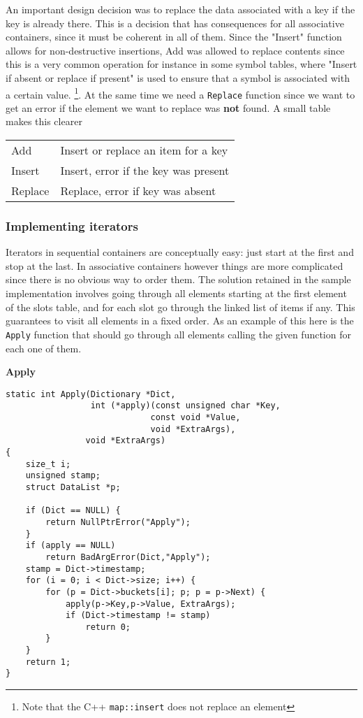 \documentclass[12pt,a4paper]{memoir} %
\newcommand{\function}[1] {%
\vspace{0.2in}
\par\noindent
\textbf{#1}\index{#1!code for \container} \hrulefill
\nopagebreak
\noindent\begin{verbatim}}
\begin{document}
{{An important design decision was to replace the data associated with a key if the key is already there. This is a decision that has consequences for 
all associative containers, since it must be coherent in all of them. Since the "Insert" function allows for non-destructive insertions, Add was
allowed to replace contents since this is a very common operation for instance in some symbol tables, where "Insert if absent or replace if present"
is used to ensure that a symbol is associated with a certain value. \footnote{Note that the C++ \texttt{map::insert} does not replace an element}. At the same time we need a \texttt{Replace} function since we want to get an error if the element we want to replace was \textbf{not} found.
A small table makes this clearer
\par %\vspace{0.5cm}
\begin{center}
\begin{tabular}{|l | l|}
\hline 
Add & Insert or replace an item for a key \\
Insert & Insert, error if the key was present \\
Replace & Replace, error if key was absent \\
\hline
\end{tabular}
\end{center}

\subsubsection{Implementing iterators}
Iterators in sequential containers are conceptually easy: just start at the first and stop at the last. In associative containers however things are 
more complicated since there is no obvious way to order them. The solution retained in the sample implementation involves going through all elements
starting at the first element of the slots table, and for each slot go through the linked list of items if any. This guarantees to visit all elements 
in a fixed order. As an example of this here is the \texttt{Apply} function that should go through all elements calling the given function for each 
one of them.
\function{Apply}
static int Apply(Dictionary *Dict,
                 int (*apply)(const unsigned char *Key,
                             const void *Value, 
                             void *ExtraArgs),
                void *ExtraArgs)
{
    size_t i;
    unsigned stamp;
    struct DataList *p;

    if (Dict == NULL) {
        return NullPtrError("Apply");
    }
    if (apply == NULL)
        return BadArgError(Dict,"Apply");
    stamp = Dict->timestamp;
    for (i = 0; i < Dict->size; i++) {
        for (p = Dict->buckets[i]; p; p = p->Next) {
            apply(p->Key,p->Value, ExtraArgs);
            if (Dict->timestamp != stamp)
                return 0;
        }
    }
    return 1;
}
\end{verbatim}

}}
\end{document}
